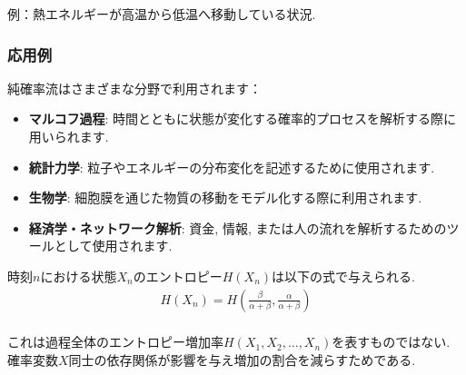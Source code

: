 \documentclass[a4j]{jsarticle}
\begin{document}
{\begin{enumerate}
		      例：熱エネルギーが高温から低温へ移動している状況.
	\end{enumerate}

	\subsubsection*{応用例}
	純確率流はさまざまな分野で利用されます：

	\begin{itemize}
		\item \textbf{マルコフ過程}:
		      時間とともに状態が変化する確率的プロセスを解析する際に用いられます.
		\item \textbf{統計力学}:
		      粒子やエネルギーの分布変化を記述するために使用されます.
		\item \textbf{生物学}:
		      細胞膜を通じた物質の移動をモデル化する際に利用されます.
		\item \textbf{経済学・ネットワーク解析}:
		      資金, 情報, または人の流れを解析するためのツールとして使用されます.
	\end{itemize}
}

 時刻$n$における状態$X_n$のエントロピー$H(X_n)$は以下の式で与えられる.
\begin{align}
	H(X_n) = H\left(\frac{\beta}{\alpha + \beta}, \frac{\alpha}{\alpha + \beta}\right)
\end{align}\\

これは過程全体のエントロピー増加率$H(X_1, X_2, \ldots, X_n)$を表すものではない. 確率変数$X$同士の依存関係が影響を与え増加の割合を減らすためである.
\end{document}
